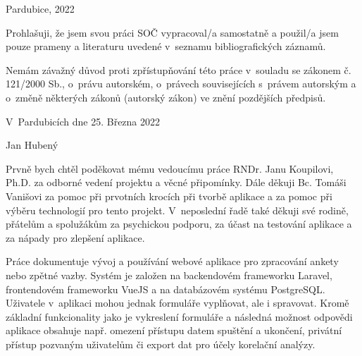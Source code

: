 \noindent Pardubice, 2022

\cleardoublepage


\noindent Prohlašuji, že jsem svou práci SOČ vypracoval/a samostatně a použil/a jsem pouze prameny a literaturu uvedené v~seznamu bibliografických záznamů.

\noindent Nemám závažný důvod proti zpřístupňování této práce v~souladu se zákonem č. 121/2000 Sb., o~právu autorském, o~právech souvisejících s~právem autorským a o~změně některých zákonů (autorský zákon) ve znění pozdějších předpisů.  

\vspace{24 pt}

\noindent V~Pardubicích dne 25. Března 2022 \dotfill{} 

\hspace{8.5cm} Jan Hubený

\cleardoublepage

\vspace*{0.8\textheight}

\noindent
Prvně bych chtěl poděkovat mému vedoucímu práce RNDr. Janu Koupilovi, Ph.D. za odborné vedení projektu a věcné připomínky. Dále děkuji Bc. Tomáši Vanišovi za pomoc při prvotních krocích při tvorbě aplikace a za pomoc při výběru technologií pro tento projekt. V~neposlední řadě také děkuji své rodině, přátelům a spolužákům za psychickou podporu, za účast na testování aplikace a za nápady pro zlepšení aplikace.

\cleardoublepage


\noindent 
Práce dokumentuje vývoj a používání webové aplikace pro zpracování ankety nebo zpětné vazby. Systém je založen na backendovém frameworku Laravel, frontendovém frameworku VueJS a na databázovém systému PostgreSQL. Uživatele v~aplikaci mohou jednak formuláře vyplňovat, ale i spravovat. Kromě základní funkcionality jako je vykreslení formuláře a následná možnost odpovědi aplikace obsahuje např. omezení přístupu datem spuštění a ukončení, privátní přístup pozvaným uživatelům či export dat pro účely korelační analýzy.

\vspace{18pt}


